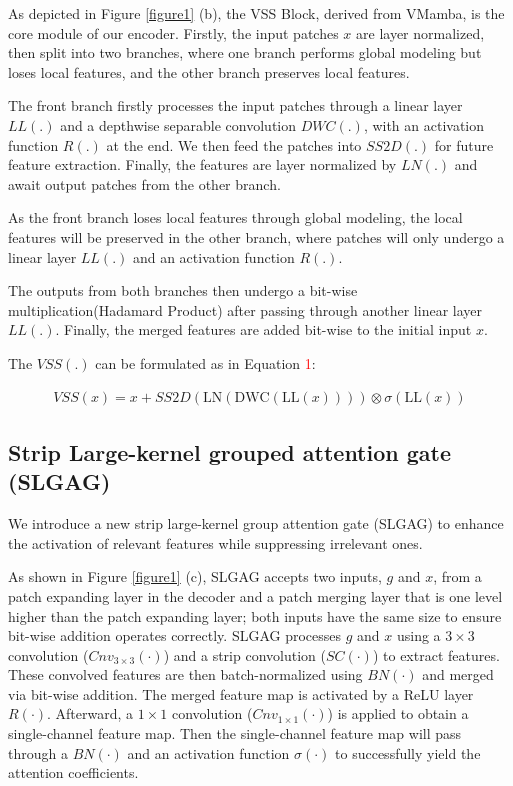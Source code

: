 \documentclass[runningheads]{llncs}
\begin{document}
As depicted in Figure \textcolor{red}{\ref{figure1}} (b), the VSS Block, derived from VMamba\cite{zhu2024vim,liu2024vmamba}, is the core module of our encoder. Firstly, the input patches $x$ are layer normalized, then split into two branches, where one branch performs global modeling but loses local features, and the other branch preserves local features.

The front branch firstly processes the input patches through a linear layer $LL(.)$ and a depthwise separable convolution $DWC(.)$, with an activation function $R(.)$ at the end. We then feed the patches into $SS2D(.)$ for future feature extraction. Finally, the features are layer normalized by $LN(.)$ and await output patches from the other branch.

As the front branch loses local features through global modeling, the local features will be preserved in the other branch, where patches will only undergo a linear layer $LL(.)$ and an activation function $R(.)$.

The outputs from both branches then undergo a bit-wise multiplication(Hadamard Product) after passing through another linear layer $LL(.)$. Finally, the merged features are added bit-wise to the initial input $x$.

The $VSS(.)$ can be formulated as in Equation \textcolor{red}{1}:
\begin{scriptsize} 
\begin{align} 
  VSS(x) = x + SS2D\left(\text{LN}\left(\text{DWC}\left(\text{LL}(x)\right)\right)\right) \otimes \sigma\left(\text{LL}(x)\right)
\end{align} 
\end{scriptsize}



\subsection{Strip Large-kernel grouped attention gate (SLGAG)}

We introduce a new strip large-kernel group attention gate (SLGAG) to enhance the activation of relevant features while suppressing irrelevant ones. 

As shown in Figure \textcolor{red}{\ref{figure1}} (c), SLGAG accepts two inputs, $g$ and $x$, from a patch expanding layer in the decoder and a patch merging layer that is one level higher than the patch expanding layer; both inputs have the same size to ensure bit-wise addition operates correctly. SLGAG processes $g$ and $x$ using a $3 \times 3$ convolution ($Cnv_{3\times 3}(\cdot)$) and a strip convolution ($SC(\cdot)$) to extract features. These convolved features are then batch-normalized using $BN(\cdot)$ and merged via bit-wise addition. The merged feature map is activated by a ReLU layer $R(\cdot)$. Afterward, a $1 \times 1$ convolution ($Cnv_{1\times 1}(\cdot)$) is applied to obtain a single-channel feature map. Then the single-channel feature map will pass through a $BN(\cdot)$ and an activation function $\sigma(\cdot)$ to successfully yield the attention coefficients. 
\end{document}
